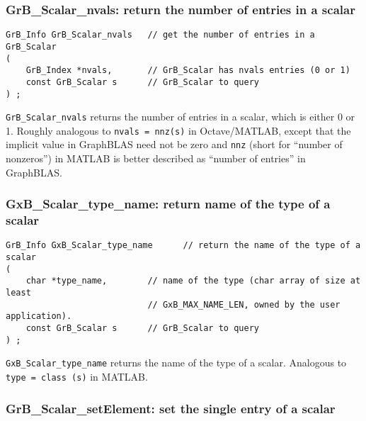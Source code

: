 \documentclass[12pt]{article}
\begin{document}
{\subsubsection{{\sf GrB\_Scalar\_nvals:} return the number of entries in a scalar}
\label{scalar_nvals}

\begin{mdframed}[userdefinedwidth=6in]
{\footnotesize
\begin{verbatim}
GrB_Info GrB_Scalar_nvals   // get the number of entries in a GrB_Scalar
(
    GrB_Index *nvals,       // GrB_Scalar has nvals entries (0 or 1)
    const GrB_Scalar s      // GrB_Scalar to query
) ;
\end{verbatim}
} \end{mdframed}

\verb'GrB_Scalar_nvals' returns the number of entries in a scalar, which
is either 0 or 1.  Roughly analogous to \verb'nvals = nnz(s)' in Octave/MATLAB,
except that the implicit value in GraphBLAS need not be zero and \verb'nnz'
(short for ``number of nonzeros'') in MATLAB is better described as ``number of
entries'' in GraphBLAS.

\subsubsection{{\sf GxB\_Scalar\_type\_name:} return name of the type of a scalar}
\label{scalar_type_name}

\begin{mdframed}[userdefinedwidth=6in]
{\footnotesize
\begin{verbatim}
GrB_Info GxB_Scalar_type_name      // return the name of the type of a scalar
(
    char *type_name,        // name of the type (char array of size at least
                            // GxB_MAX_NAME_LEN, owned by the user application).
    const GrB_Scalar s      // GrB_Scalar to query
) ;
\end{verbatim}
} \end{mdframed}

\verb'GxB_Scalar_type_name' returns the name of the type of a scalar.
Analogous to \verb'type = class (s)' in MATLAB.

\subsubsection{{\sf GrB\_Scalar\_setElement:} set the single entry of a scalar}
\label{scalar_setElement}

}
\end{document}
